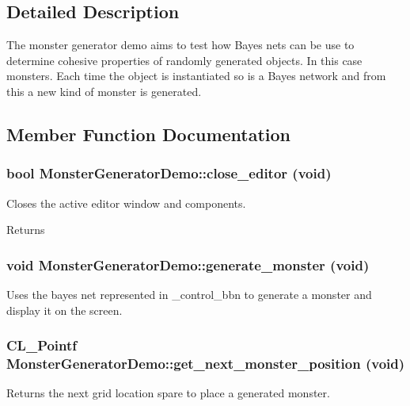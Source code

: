 \subsection{Detailed Description}
The monster generator demo aims to test how Bayes nets can be use to determine cohesive properties of randomly generated objects. In this case monsters. Each time the object is instantiated so is a Bayes network and from this a new kind of monster is generated. 

\subsection{Member Function Documentation}
\hypertarget{classMonsterGeneratorDemo_a81a9869082eb20376f4a53723d805bfa}{
\subsubsection[{close\_\-editor}]{\setlength{\rightskip}{0pt plus 5cm}bool MonsterGeneratorDemo::close\_\-editor (void)}}
\label{classMonsterGeneratorDemo_a81a9869082eb20376f4a53723d805bfa}
Closes the active editor window and components.

\begin{DoxyReturn}{Returns}

\end{DoxyReturn}
\hypertarget{classMonsterGeneratorDemo_a9f7a998bfd08409c3db44c755d50721f}{
\subsubsection[{generate\_\-monster}]{\setlength{\rightskip}{0pt plus 5cm}void MonsterGeneratorDemo::generate\_\-monster (void)}}
\label{classMonsterGeneratorDemo_a9f7a998bfd08409c3db44c755d50721f}
Uses the bayes net represented in \_\-control\_\-bbn to generate a monster and display it on the screen. \hypertarget{classMonsterGeneratorDemo_a82938578e271b99cb300c6a668dff550}{
\subsubsection[{get\_\-next\_\-monster\_\-position}]{\setlength{\rightskip}{0pt plus 5cm}CL\_\-Pointf MonsterGeneratorDemo::get\_\-next\_\-monster\_\-position (void)}}
\label{classMonsterGeneratorDemo_a82938578e271b99cb300c6a668dff550}
Returns the next grid location spare to place a generated monster.

